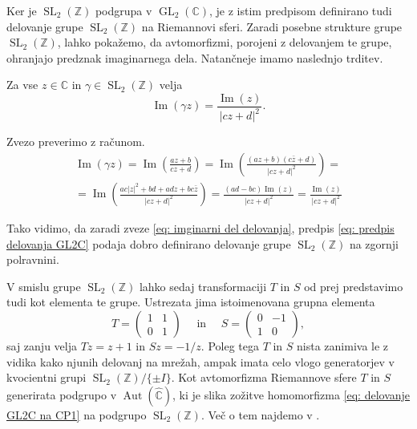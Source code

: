 \documentclass[mat1]{fmfdelo}
\numberwithin{equation}{section}
\newcommand{\Z}{\mathbb Z}
\newcommand{\C}{\mathbb C}
\newcommand{\RS}{\widehat{\C}}
\newcommand{\SL}{\operatorname{SL}_2(\Z)}
\newcommand{\abs}[1]{\left\lvert #1 \right\rvert}
\renewcommand\Im{\operatorname{Im}}%
\DeclareMathOperator{\GL}{GL}
\DeclareMathOperator{\Aut}{Aut}
\theoremstyle{definition}
\begin{document}
Ker je $\SL$ podgrupa v $\GL_2(\C)$, je z istim predpisom definirano tudi delovanje grupe $\SL$ na Riemannovi sferi. Zaradi posebne strukture grupe $\SL$, lahko pokažemo, da avtomorfizmi, porojeni z delovanjem te grupe, ohranjajo predznak imaginarnega dela. Natančneje imamo naslednjo trditev.

\begin{trditev}
    Za vse $z \in \C$ in $\gamma \in \SL$ velja 
    \begin{equation}
        \label{eq: imginarni del delovanja}
        \Im(\gamma z) = \frac{\Im(z)}{\abs{cz + d}^2}.
    \end{equation} 
\end{trditev} 

\begin{dokaz}
Zvezo preverimo z računom.
\begin{multline*}
    \Im(\gamma z) = 
    \Im\left(\frac{az + b}{cz + d}\right) = 
    \Im\left(\frac{(az + b)(c\bar{z} + d)}{\abs{cz + d}^2}\right) = \\
    = \Im\left(\frac{ac\abs{z}^2 + bd + adz + bc\bar{z}}{\abs{cz + d}^2}\right) = 
    \frac{(ad - bc)\Im(z)}{\abs{cz + d}^2} = \frac{\Im(z)}{\abs{cz + d}^2}
\end{multline*}
\end{dokaz}
\begin{opomba}
    Tako vidimo, da zaradi zveze \eqref{eq: imginarni del delovanja}, predpis \eqref{eq: predpis delovanja GL2C} podaja dobro definirano delovanje grupe $\SL$ na zgornji polravnini.
\end{opomba}

V smislu grupe $\SL$ lahko sedaj transformaciji $T$ in $S$ od prej predstavimo tudi kot elementa te grupe. Ustrezata jima istoimenovana grupna elementa
\[
    T = \begin{pmatrix}1 & 1 \\ 0 & 1\end{pmatrix} \quad \text{ in } \quad
    S = \begin{pmatrix}0 & -1 \\ 1 & 0\end{pmatrix},
\]
saj zanju velja $Tz = z + 1$ in $Sz = -1/z$. Poleg tega $T$ in $S$ nista zanimiva le z vidika kako njunih delovanj na mrežah, ampak imata celo vlogo generatorjev v kvocientni grupi $\SL/\{\pm I\}$. Kot avtomorfizma Riemannove sfere $T$ in $S$ generirata podgrupo v $\Aut(\RS)$, ki je slika zožitve homomorfizma \eqref{eq: delovanje GL2C na CP1} na podgrupo $\SL$. Več o tem najdemo v \cite[VII, \S 1.]{Serre}.
\end{document}
